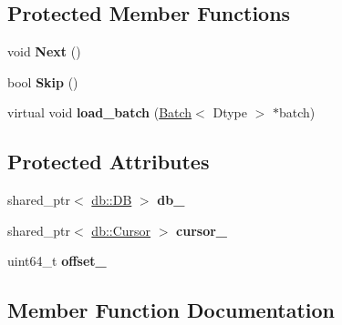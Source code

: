\subsection*{Protected Member Functions}
\begin{DoxyCompactItemize}
\item 
void {\bfseries Next} ()\hypertarget{classcaffe_1_1DataLayer_a16238c3e219f4215faa4da08f670551f}{}\label{classcaffe_1_1DataLayer_a16238c3e219f4215faa4da08f670551f}

\item 
bool {\bfseries Skip} ()\hypertarget{classcaffe_1_1DataLayer_a230e84eafe73df8e7da3c41b2e3430e1}{}\label{classcaffe_1_1DataLayer_a230e84eafe73df8e7da3c41b2e3430e1}

\item 
virtual void {\bfseries load\+\_\+batch} (\hyperlink{classcaffe_1_1Batch}{Batch}$<$ Dtype $>$ $\ast$batch)\hypertarget{classcaffe_1_1DataLayer_a5f14e385399a658476642d225a2827f9}{}\label{classcaffe_1_1DataLayer_a5f14e385399a658476642d225a2827f9}

\end{DoxyCompactItemize}
\subsection*{Protected Attributes}
\begin{DoxyCompactItemize}
\item 
shared\+\_\+ptr$<$ \hyperlink{classcaffe_1_1db_1_1DB}{db\+::\+DB} $>$ {\bfseries db\+\_\+}\hypertarget{classcaffe_1_1DataLayer_af6384a1dcc37d32c7f556080da3c006d}{}\label{classcaffe_1_1DataLayer_af6384a1dcc37d32c7f556080da3c006d}

\item 
shared\+\_\+ptr$<$ \hyperlink{classcaffe_1_1db_1_1Cursor}{db\+::\+Cursor} $>$ {\bfseries cursor\+\_\+}\hypertarget{classcaffe_1_1DataLayer_ad26510baf81f48d92569ea95a8643af0}{}\label{classcaffe_1_1DataLayer_ad26510baf81f48d92569ea95a8643af0}

\item 
uint64\+\_\+t {\bfseries offset\+\_\+}\hypertarget{classcaffe_1_1DataLayer_a1af404785922d764270d7d5a195d90df}{}\label{classcaffe_1_1DataLayer_a1af404785922d764270d7d5a195d90df}

\end{DoxyCompactItemize}


\subsection{Member Function Documentation}
